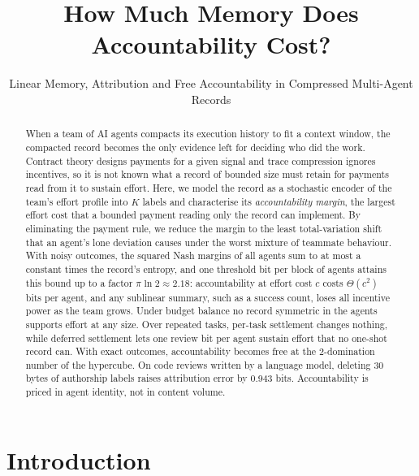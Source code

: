 \documentclass[sigconf,anonymous,acmthm=false]{aamas}
\theoremstyle{acmplain}
\theoremstyle{acmdefinition}
\begin{document}
\title[How Much Memory Does Accountability Cost?]{How Much Memory Does Accountability Cost?}
\subtitle{Linear Memory, Attribution and Free Accountability in Compressed Multi-Agent Records}

\begin{abstract}
When a team of AI agents compacts its execution history to fit a context window, the
compacted record becomes the only evidence left for deciding who did the work. Contract
theory designs payments for a given signal and trace compression ignores incentives, so it
is not known what a record of bounded size must retain for payments read from it to sustain
effort. Here, we model the record as a stochastic encoder of the team's effort profile into
$K$ labels and characterise its \emph{accountability margin}, the largest effort cost that a
bounded payment reading only the record can implement. By eliminating the payment rule, we
reduce the margin to the least total-variation shift that an agent's lone deviation causes
under the worst mixture of teammate behaviour. With noisy outcomes, the squared Nash margins
of all agents sum to at most a constant times the record's entropy, and one threshold bit per
block of agents attains this bound up to a factor $\pi\ln2\approx2.18$: accountability at
effort cost $c$ costs $\Theta(c^2)$ bits per agent, and any sublinear summary, such as a
success count, loses all incentive power as the team grows. Under budget balance no record
symmetric in the agents supports effort at any size. Over repeated tasks, per-task settlement
changes nothing, while deferred settlement lets one review bit per agent sustain effort that
no one-shot record can. With exact outcomes, accountability becomes free at the 2-domination
number of the hypercube. On code reviews written by a language model, deleting 30 bytes of
authorship labels raises attribution error by 0.943 bits. Accountability is priced in agent
identity, not in content volume.
\end{abstract}


\maketitle

\section{Introduction}\label{sec:intro}
\end{document}
